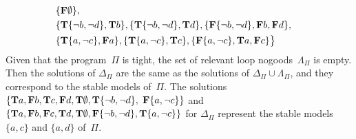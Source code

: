\begin{Loesung}
{\begin{align*}
  {} \\[1mm] &
  \{\mathbf{F}\emptyset\},
  {} \\ &
  \{\mathbf{T}\{{\neg{b}},{\neg{d}}\},\mathbf{T}b\},
  \{\mathbf{T}\{{\neg{b}},{\neg{d}}\},\mathbf{T}d\},
  \{\mathbf{F}\{{\neg{b}},{\neg{d}}\},\mathbf{F}b,\mathbf{F}d\},
  {} \\ &
  \{\mathbf{T}\{a,{\neg{c}}\},\mathbf{F}a\},
  \{\mathbf{T}\{a,{\neg{c}}\},\mathbf{T}c\},
  \{\mathbf{F}\{a,{\neg{c}}\},\mathbf{T}a,\mathbf{F}c\}
  \big\}
\end{align*}
Given that the program~$\Pi$ is tight,
the set of relevant loop nogoods~$\Lambda_\Pi$ is empty.
Then the solutions of $\Delta_\Pi$
are the same as the solutions of $\Delta_\Pi\cup\Lambda_\Pi$, and
they correspond to the stable models of~$\Pi$.
%
The solutions
$\{\mathbf{T}a,\mathbf{F}b,\mathbf{T}c,\mathbf{F}d,
   \mathbf{T}\emptyset,\mathbf{T}\{{\neg{b}},{\neg{d}}\},$
$\mathbf{F}\{a,{\neg{c}}\}\}$
and
$\{\mathbf{T}a,\mathbf{F}b,\mathbf{F}c,\mathbf{T}d,
   \mathbf{T}\emptyset,\mathbf{F}\{{\neg{b}},{\neg{d}}\},\mathbf{T}\{a,{\neg{c}}\}\}$
for $\Delta_\Pi$
represent the stable models $\{a,c\}$ and $\{a,d\}$ of~$\Pi$.
%
}
\end{Loesung}
